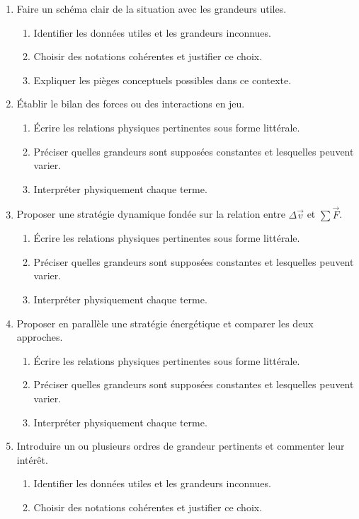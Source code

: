\documentclass[11pt,a4paper]{article}
\begin{document}
\begin{enumerate}[label=\textbf{Très long \arabic*.},leftmargin=*]
\begin{enumerate}[label=\textbf{\arabic*)}]
\item Faire un schéma clair de la situation avec les grandeurs utiles.
\begin{enumerate}[label=\alph*)]
\item Identifier les données utiles et les grandeurs inconnues.
\item Choisir des notations cohérentes et justifier ce choix.
\item Expliquer les pièges conceptuels possibles dans ce contexte.
\end{enumerate}
\item Établir le bilan des forces ou des interactions en jeu.
\begin{enumerate}[label=\alph*)]
\item Écrire les relations physiques pertinentes sous forme littérale.
\item Préciser quelles grandeurs sont supposées constantes et lesquelles peuvent varier.
\item Interpréter physiquement chaque terme.
\end{enumerate}
\item Proposer une stratégie dynamique fondée sur la relation entre $\Delta\vec v$ et $\sum\vec F$.
\begin{enumerate}[label=\alph*)]
\item Écrire les relations physiques pertinentes sous forme littérale.
\item Préciser quelles grandeurs sont supposées constantes et lesquelles peuvent varier.
\item Interpréter physiquement chaque terme.
\end{enumerate}
\item Proposer en parallèle une stratégie énergétique et comparer les deux approches.
\begin{enumerate}[label=\alph*)]
\item Écrire les relations physiques pertinentes sous forme littérale.
\item Préciser quelles grandeurs sont supposées constantes et lesquelles peuvent varier.
\item Interpréter physiquement chaque terme.
\end{enumerate}
\item Introduire un ou plusieurs ordres de grandeur pertinents et commenter leur intérêt.
\begin{enumerate}[label=\alph*)]
\item Identifier les données utiles et les grandeurs inconnues.
\item Choisir des notations cohérentes et justifier ce choix.

\end{enumerate}
\end{enumerate}
\end{enumerate}
\end{document}
